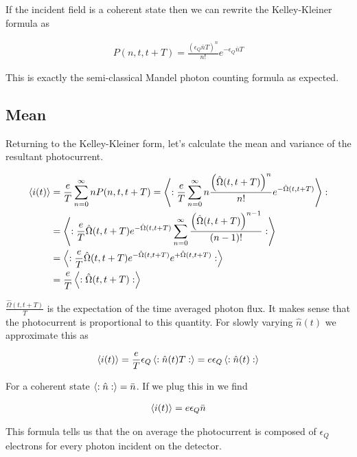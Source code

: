 \documentclass[12pt]{article}
\begin{document}
If the incident field is a coherent state then we can rewrite the Kelley-Kleiner formula as

\begin{align}
P(n,t,t+T) = \frac{\left(\epsilon_Q \bar{n} T\right)^n}{n!} e^{-\epsilon_Q \bar{n}T}
\end{align}

This is exactly the semi-classical Mandel photon counting formula as expected.

\subsection{Mean}

Returning to the Kelley-Kleiner form, let's calculate the mean and variance of the resultant photocurrent.

\begin{align}
\Braket{i(t)} &= \frac{e}{T} \sum_{n=0}^{\infty} n P(n,t,t+T) = \Braket{:\frac{e}{T} \sum_{n=0}^{\infty} n\frac{\left(\hat{\Omega}(t,t+T)\right)^n}{n!} e^{-\hat{\Omega}(t,t+T)}}:\\
&= \Braket{:\frac{e}{T} \hat{\Omega}(t,t+T) e^{-\hat{\Omega}(t,t+T)}\sum_{n=0}^{\infty} \frac{\left(\hat{\Omega}(t,t+T)\right)^{n-1}}{(n-1)!}:}\\
&= \Braket{:\frac{e}{T} \hat{\Omega}(t,t+T) e^{-\hat{\Omega}(t,t+T)} e^{+\hat{\Omega}(t,t+T)}:}\\
& = \frac{e}{T}\Braket{:\hat{\Omega}(t,t+T):}\\
\end{align}

$\frac{\hat{\Omega}(t,t+T)}{T}$ is the expectation of the time averaged photon flux. It makes sense that the photocurrent is proportional to this quantity. For slowly varying $\hat{n}(t)$ we approximate this as

\begin{align}
\Braket{i(t)} = \frac{e}{T} \epsilon_Q \Braket{:\hat{n}(t) T:} = e \epsilon_Q \Braket{:\hat{n}(t):}
\end{align}

 For a coherent state $\Braket{:\hat{n}:} = \bar{n}$. If we plug this in we find

\begin{align}
\Braket{i(t)} = e \epsilon_Q \bar{n}
\end{align}

This formula tells us that the on average the photocurrent is composed of $\epsilon_Q$ electrons for every photon incident on the detector.
\end{document}
